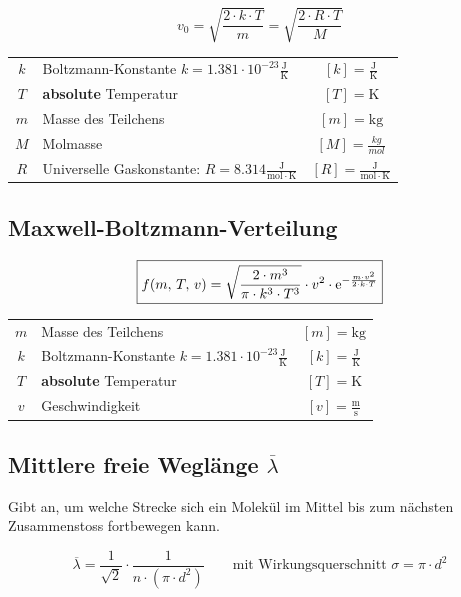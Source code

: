 $$ \boxed{ v_0 = \sqrt{\frac{2 \cdot k \cdot T}{m}} = \sqrt{\frac{2 \cdot R \cdot T}{M}}  }  $$




\begin{tabular}{c l c}
	\rule{0pt}{8pt}$k$ & Boltzmann-Konstante $k = 1.381 \cdot 10^{-23} \mathrm{\frac{J}{K}}$ & $[k] = \mathrm{\frac{J}{K}}$ \\
	$T$ & \textbf{absolute} Temperatur & $[T] = \mathrm{K}$ \\
	$m$ & Masse des Teilchens & $[m] = \mathrm{kg}$ \\
	$M$ & Molmasse & $[M] = \frac{kg}{mol}$ \\
	\rule{0pt}{10pt}$R$ & Universelle Gaskonstante: $R = 8.314 \mathrm{\frac{J}{mol \cdot K}}$ & $[R] = \mathrm{\frac{J}{mol \cdot K}} $ \\	
\end{tabular}




\subsection{Maxwell-Boltzmann-Verteilung}

$$ \boxed{ f(m, \, T, \, v) = \sqrt{\frac{2 \cdot m^3}{\pi \cdot k^3 \cdot T^3 }}  \cdot v^2 \cdot \mathrm{e} ^{- \frac{m \cdot v^2}{2 \cdot k \cdot T}}  }  $$


\begin{tabular}{c l c}
	$m$ & Masse des Teilchens & $[m] = \mathrm{kg}$ \\
	\rule{0pt}{8pt}$k$ & Boltzmann-Konstante $k = 1.381 \cdot 10^{-23} \mathrm{\frac{J}{K}}$ & $[k] = \mathrm{\frac{J}{K}}$ \\
	$T$ & \textbf{absolute} Temperatur & $[T] = \mathrm{K}$ \\
	\rule{0pt}{8pt}$v$ & Geschwindigkeit & $[v] = \mathrm{\frac{m}{s}}$ \\
\end{tabular}





\subsection{Mittlere freie Weglänge $\overline{\lambda}$}

Gibt an, um welche Strecke sich ein Molekül im Mittel bis zum nächsten Zusammenstoss fortbewegen kann.

$$ \boxed{ \overline{\lambda} = \frac{1}{\sqrt{2}} \cdot \frac{1}{n \cdot (\pi \cdot d^2 )} }  \qquad \text{mit Wirkungsquerschnitt } \sigma = \pi \cdot d^2$$

